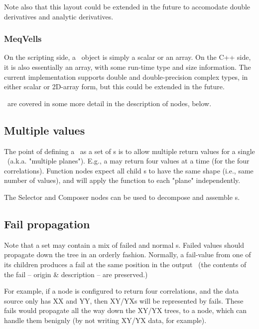 \documentclass[10pt]{article}
\begin{document}
  Note also that this layout could be extended in the future to accomodate
  double derivatives and analytic derivatives.

\subsubsection{MeqVells}

  On the scripting side, a \Vells\ object is simply a scalar or an array. On
  the C++ side, it is also essentially an array, with some run-time type and
  size information. The current implementation supports double and
  double-precision complex types, in either scalar or 2D-array form, but this
  could be extended in the future.

  \Vells\ are covered in some more detail in the description of 
  nodes, below.

\subsection{Multiple values}

  The point of defining a \Result\ as a set of \VellSet{}s is to allow multiple
  return values for a single \Cells\ (a.k.a. "multiple planes"). E.g., a
   may return four values at a time (for the four correlations).
  Function nodes expect all child \Result{}s to have the same shape (i.e., same
  number of values), and will apply the function to each "plane" independently.

  The Selector and Composer nodes can be used to decompose and assemble
  \Result{}s.
  
\subsection{Fail propagation}

  Note that a set may contain a mix of failed and normal \VellSet{}s. Failed
  values should propagate down the tree in an orderly fashion. Normally, a
  fail-value from one of its children produces a fail at the same position in
  the output \Result\ (the contents of the fail -- origin \& description -- are
  preserved.)

  For example, if a  node is configured to return four correlations,
  and the data source only has XX and YY, then XY/YXs will be represented by
  fails. These fails would propagate all the way down the XY/YX trees, to a
   node, which can handle them benignly (by not writing XY/YX data,
  for example).
\end{document}
